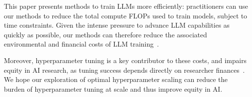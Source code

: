 This paper presents methods to train LLMs more efficiently:
practitioners can use our methods to reduce the total compute FLOPs
used to train models, subject to time constraints.
%
Given the intense pressure to advance LLM capabilities as quickly as
possible, our methods can therefore reduce the associated
environmental and financial costs of LLM
training~\citep{patterson2021carbon,bender2021dangers}.

Moreover, hyperparameter tuning is a key contributor to these costs,
and impairs equity in AI research, as tuning success depends directly
on researcher finances~\citep{strubell2019energy}.
We hope our exploration of optimal hyperparameter scaling can reduce
the burden of hyperparameter tuning at scale and thus improve equity
in AI\@.
